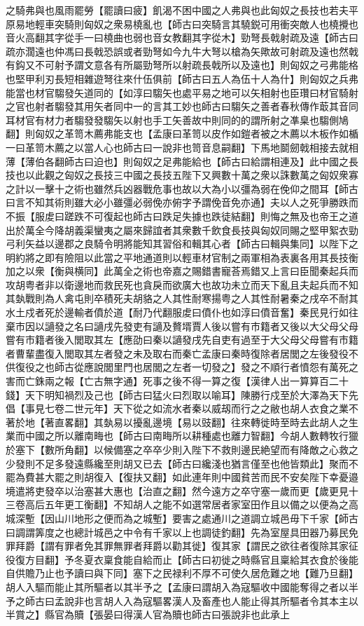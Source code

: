 之騎弗與也風雨罷勞【罷讀曰疲】飢渴不困中國之人弗與也此匈奴之長技也若夫平原易地輕車突騎則匈奴之衆易橈亂也【師古曰突騎言其驍鋭可用衝突敵人也橈攪也音火高翻其字從手一曰橈曲也弱也音女教翻其字從木】勁弩長戟射疏及遠【師古曰疏亦濶遠也仲馮曰長戟恐誤或者勁弩如今九牛大弩以槍為矢歟故可射疏及遠也然戟有鈎又不可射予謂文意各有所屬勁弩所以射疏長戟所以及遠也】則匈奴之弓弗能格也堅甲利刃長短相雜遊弩往來什伍俱前【師古曰五人為伍十人為什】則匈奴之兵弗能當也材官騶發矢道同的【如淳曰騶矢也處平易之地可以矢相射也臣瓚曰材官騎射之官也射者騶發其用矢者同中一的言其工妙也師古曰騶矢之善者春秋傳作菆其音同耳材官有材力者騶發發騶矢以射也手工矢善故中則同的的謂所射之凖臬也騶側鳩翻】則匈奴之革笥木薦弗能支也【孟康曰革笥以皮作如鎧者被之木薦以木板作如楯一曰革笥木薦之以當人心也師古曰一說非也笥音息嗣翻】下馬地鬬劒戟相接去就相薄【薄伯各翻師古曰迫也】則匈奴之足弗能給也【師古曰給謂相連及】此中國之長技也以此觀之匈奴之長技三中國之長技五陛下又興數十萬之衆以誅數萬之匈奴衆寡之計以一擊十之術也雖然兵凶器戰危事也故以大為小以彊為弱在俛仰之間耳【師古曰言不知其術則雖大必小雖彊必弱俛亦俯字予謂俛音免亦通】夫以人之死爭勝跌而不振【服䖍曰蹉跌不可復起也師古曰跌足失據也跌徒結翻】則悔之無及也帝王之道出於萬全今降胡義渠蠻夷之屬來歸誼者其衆數千飲食長技與匈奴同賜之堅甲絮衣勁弓利矢益以邊郡之良騎令明將能知其習俗和輯其心者【師古曰輯與集同】以陛下之明約將之即有險阻以此當之平地通道則以輕車材官制之兩軍相為表裏各用其長技衡加之以衆【衡與横同】此萬全之術也帝嘉之賜錯書寵荅焉錯又上言曰臣聞秦起兵而攻胡粤者非以衛邊地而救民死也貪戾而欲廣大也故功未立而天下亂且夫起兵而不知其埶戰則為人禽屯則卒積死夫胡貉之人其性耐寒揚粤之人其性耐暑秦之戌卒不耐其水土戍者死於邊輸者僨於道【耐乃代翻服䖍曰僨仆也如淳曰僨音奮】秦民見行如往棄市因以讁發之名曰讁戌先發吏有讁及贅壻賈人後以嘗有市籍者又後以大父母父母嘗有市籍者後入閭取其左【應劭曰秦以讁發戌先自吏有過至于大父母父母嘗有市籍者曹輩盡復入閭取其左者發之未及取右而秦亡孟康曰秦時復除者居閭之左後發役不供復役之也師古從應說閭里門也居閭之左者一切發之】發之不順行者憤怨有萬死之害而亡銖兩之報【亡古無字通】死事之後不得一算之復【漢律人出一算算百二十錢】天下明知禍烈及己也【師古曰猛火曰烈取以喻耳】陳勝行戍至於大澤為天下先倡【事見七卷二世元年】天下從之如流水者秦以威刼而行之之敝也胡人衣食之業不著於地【著直畧翻】其埶易以擾亂邊境【易以豉翻】往來轉徙時至時去此胡人之生業而中國之所以離南畮也【師古曰南畮所以耕種處也離力智翻】今胡人數轉牧行獵於塞下【數所角翻】以候備塞之卒卒少則入陛下不救則邊民絶望而有降敵之心救之少發則不足多發遠縣纔至則胡又已去【師古曰纔淺也猶言僅至也他皆類此】聚而不罷為費甚大罷之則胡復入【復扶又翻】如此連年則中國貧苦而民不安矣陛下幸憂邉境遣將吏發卒以治塞甚大惠也【治直之翻】然今遠方之卒守塞一歲而更【歲更見十三卷高后五年更工衡翻】不知胡人之能不如選常居者家室田作且以備之以便為之高城深塹【因山川地形之便而為之城塹】要害之處通川之道調立城邑毋下千家【師古曰調謂筭度之也總計城邑之中令有千家以上也調徒釣翻】先為室屋具田器乃募民免罪拜爵【謂有罪者免其罪無罪者拜爵以勸其徙】復其家【謂民之欲往者復除其家征役復方目翻】予冬夏衣稟食能自給而止【師古曰初徙之時縣官且稟給其衣食於後能自供贍乃止也予讀曰與下同】塞下之民禄利不厚不可使久居危難之地【難乃旦翻】胡人入驅而能止其所驅者以其半予之【孟康曰謂胡入為寇驅收中國能奪得之者以半予之師古曰孟說非也言胡人入為寇驅畧漢人及畜產也人能止得其所驅者令其本主以半賞之】縣官為贖【張晏曰得漢人官為贖也師古曰張說非也此承上